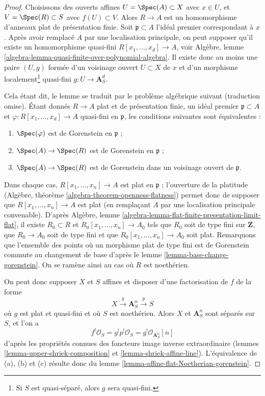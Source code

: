 \begin{proof}
Choisissons des ouverts affines $U = \Spec(A) \subset X$ avec $x \in U$, et $V = \Spec(R) \subset S$ avec $f(U) \subset V$. Alors $R \to A$ est un homomorphisme d'anneaux plat de présentation finie. Soit $\mathfrak p \subset A$ l'idéal premier correspondant à $x$. Après avoir remplacé $A$ par une localisation principale, on peut supposer qu'il existe un homomorphisme quasi-fini $R[x_1, \ldots, x_d]  \to A$, voir Algèbre, lemme \ref{algebra-lemma-quasi-finite-over-polynomial-algebra}. Il existe donc au moins une paire $(U, g)$ formée d'un voisinage ouvert $U \subset X$ de $x$ et d'un morphisme localement\footnote{Si $S$ est quasi-séparé, alors $g$ sera quasi-fini.} quasi-fini $g : U \to \mathbf{A}^d_S$.

\medskip\noindent
Cela étant dit, le lemme se traduit par le problème algébrique suivant (traduction omise). Étant donnés $R \to A$ plat et de présentation finie, un idéal premier $\mathfrak p \subset A$ et $\varphi : R[x_1, \ldots, x_d] \to A$ quasi-fini en $\mathfrak p$, les conditions suivantes sont équivalentes :
\begin{enumerate}
\item[(a)] $\Spec(\varphi)$ est de Gorenstein en $\mathfrak p$ ;
\item[(b)] $\Spec(A) \to \Spec(R)$ est de Gorenstein en $\mathfrak p$ ;
\item[(c)] $\Spec(A) \to \Spec(R)$ est de Gorenstein dans un voisinage ouvert de $\mathfrak p$.
\end{enumerate}
Dans chaque cas, $R[x_1, \ldots, x_n] \to A$ est plat en $\mathfrak p$ ; l'ouverture de la platitude (Algèbre, théorème \ref{algebra-theorem-openness-flatness}) permet donc de supposer que $R[x_1, \ldots, x_n] \to A$ est plat (en remplaçant $A$ par une localisation principale convenable). D'après Algèbre, lemme \ref{algebra-lemma-flat-finite-presentation-limit-flat}, il existe $R_0 \subset R$ et $R_0[x_1, \ldots, x_n] \to A_0$ tels que $R_0$ soit de type fini sur $\mathbf{Z}$, que $R_0 \to A_0$ soit de type fini et que $R_0[x_1, \ldots, x_n] \to A_0$ soit plat. Remarquons que l'ensemble des points où un morphisme plat de type fini est de Gorenstein commute au changement de base d'après le lemme \ref{lemma-base-change-gorenstein}. On se ramène ainsi au cas où $R$ est noethérien.

\medskip\noindent
On peut donc supposer $X$ et $S$ affines et disposer d'une factorisation de $f$ de la forme
$$
X \xrightarrow{g} \mathbf{A}^n_S \xrightarrow{p} S
$$
où $g$ est plat et quasi-fini et où $S$ est noethérien. Alors $X$ et $\mathbf{A}^n_S$ sont séparés sur $S$, et l'on a
$$
f^!\mathcal{O}_S = g^!p^!\mathcal{O}_S = g^!\mathcal{O}_{\mathbf{A}^n_S}[n]
$$
d'après les propriétés connues des foncteurs image inverse extraordinaire (lemmes \ref{lemma-upper-shriek-composition} et \ref{lemma-shriek-affine-line}). L'équivalence de (a), (b) et (c) résulte donc du lemme \ref{lemma-affine-flat-Noetherian-gorenstein}.
\end{proof}

